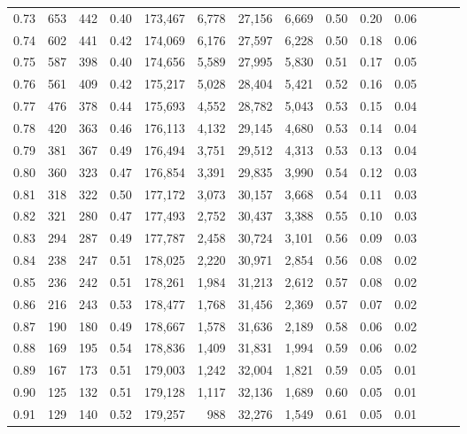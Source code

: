 \begin{tabular}{rrrrrrrrrrrrrr}
0.73 &    653 &  442 &  0.40 &  173,467 &    6,778 &  27,156 &   6,669 &  0.50 &  0.20 &      0.06 \\
0.74 &    602 &  441 &  0.42 &  174,069 &    6,176 &  27,597 &   6,228 &  0.50 &  0.18 &      0.06 \\
0.75 &    587 &  398 &  0.40 &  174,656 &    5,589 &  27,995 &   5,830 &  0.51 &  0.17 &      0.05 \\
0.76 &    561 &  409 &  0.42 &  175,217 &    5,028 &  28,404 &   5,421 &  0.52 &  0.16 &      0.05 \\
0.77 &    476 &  378 &  0.44 &  175,693 &    4,552 &  28,782 &   5,043 &  0.53 &  0.15 &      0.04 \\
0.78 &    420 &  363 &  0.46 &  176,113 &    4,132 &  29,145 &   4,680 &  0.53 &  0.14 &      0.04 \\
0.79 &    381 &  367 &  0.49 &  176,494 &    3,751 &  29,512 &   4,313 &  0.53 &  0.13 &      0.04 \\
0.80 &    360 &  323 &  0.47 &  176,854 &    3,391 &  29,835 &   3,990 &  0.54 &  0.12 &      0.03 \\
0.81 &    318 &  322 &  0.50 &  177,172 &    3,073 &  30,157 &   3,668 &  0.54 &  0.11 &      0.03 \\
0.82 &    321 &  280 &  0.47 &  177,493 &    2,752 &  30,437 &   3,388 &  0.55 &  0.10 &      0.03 \\
0.83 &    294 &  287 &  0.49 &  177,787 &    2,458 &  30,724 &   3,101 &  0.56 &  0.09 &      0.03 \\
0.84 &    238 &  247 &  0.51 &  178,025 &    2,220 &  30,971 &   2,854 &  0.56 &  0.08 &      0.02 \\
0.85 &    236 &  242 &  0.51 &  178,261 &    1,984 &  31,213 &   2,612 &  0.57 &  0.08 &      0.02 \\
0.86 &    216 &  243 &  0.53 &  178,477 &    1,768 &  31,456 &   2,369 &  0.57 &  0.07 &      0.02 \\
0.87 &    190 &  180 &  0.49 &  178,667 &    1,578 &  31,636 &   2,189 &  0.58 &  0.06 &      0.02 \\
0.88 &    169 &  195 &  0.54 &  178,836 &    1,409 &  31,831 &   1,994 &  0.59 &  0.06 &      0.02 \\
0.89 &    167 &  173 &  0.51 &  179,003 &    1,242 &  32,004 &   1,821 &  0.59 &  0.05 &      0.01 \\
0.90 &    125 &  132 &  0.51 &  179,128 &    1,117 &  32,136 &   1,689 &  0.60 &  0.05 &      0.01 \\
0.91 &    129 &  140 &  0.52 &  179,257 &      988 &  32,276 &   1,549 &  0.61 &  0.05 &      0.01 \\

\end{tabular}
